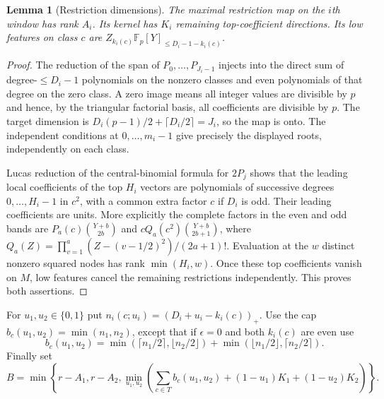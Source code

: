 \documentclass[11pt]{article}
\newtheorem{lemma}[theorem]{Lemma}
\theoremstyle{definition}\newtheorem{definition}[theorem]{Definition}
\theoremstyle{remark}\newtheorem{remark}[theorem]{Remark}
\begin{document}
\begin{lemma}[Restriction dimensions]\label{zthree:dimensions}
The maximal restriction map on the $i$th window has rank $A_i$.
Its kernel has $K_i$ remaining top-coefficient directions. Its low
features on class $c$ are
$Z_{k_i(c)}\mathbb F_p[Y]_{\le D_i-1-k_i(c)}$.
\end{lemma}
\begin{proof}
The reduction of the span of $P_0,\ldots,P_{J_i-1}$ injects into the
direct sum of degree-$\le D_i-1$ polynomials on the nonzero classes
and even polynomials of that degree on the zero class. A zero image
means all integer values are divisible by $p$ and hence, by the
triangular factorial basis, all coefficients are divisible by $p$.
The target dimension is $D_i(p-1)/2+\lceil D_i/2\rceil=J_i$, so
the map is onto. The independent conditions at $0,\ldots,m_i-1$
give precisely the displayed roots, independently on each class.

Lucas reduction of the central-binomial formula for $2P_j$ shows
that the leading local coefficients of the top $H_i$ vectors are
polynomials of successive degrees $0,\ldots,H_i-1$ in $c^2$, with
a common extra factor $c$ if $D_i$ is odd. Their leading coefficients
are units. More explicitly the complete factors in the even and
odd bands are $P_a(c)\binom{Y+b}{2b}$ and
$cQ_a(c^2)\binom{Y+b}{2b+1}$, where
$Q_a(Z)=\prod_{v=1}^a(Z-(v-1/2)^2)/(2a+1)!$.
Evaluation at the $w$ distinct nonzero squared nodes has rank
$\min(H_i,w)$. Once these top coefficients vanish on $M$, low
features cancel the remaining restrictions independently. This
proves both assertions.
\end{proof}

For $u_1,u_2\in\{0,1\}$ put $n_i(c;u_i)=(D_i+u_i-k_i(c))_+$.
Use the cap $b_c(u_1,u_2)=\min(n_1,n_2)$, except that if
$\epsilon=0$ and both $k_i(c)$ are even use
\begin{equation}\label{zthree:paritycap}
 b_c(u_1,u_2)=
 \min(\lceil n_1/2\rceil,\lfloor n_2/2\rfloor)
 +\min(\lfloor n_1/2\rfloor,\lceil n_2/2\rceil).
\end{equation}
Finally set
\begin{equation}\label{zthree:B}
 B=\min\left\{r-A_1,r-A_2,
 \min_{u_1,u_2}\left(\sum_{c\in T}b_c(u_1,u_2)
                       +(1-u_1)K_1+(1-u_2)K_2\right)\right\}.
\end{equation}
\end{document}
